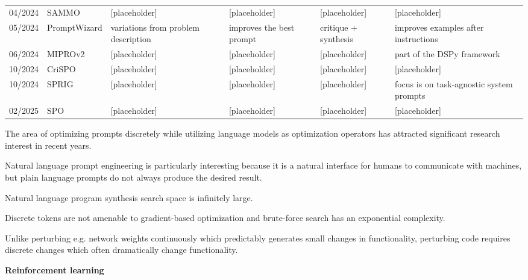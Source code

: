 \begin{landscape}
\begin{longtable}{@{}l l p{3.5cm} p{3.5cm} p{3.5cm} p{3.5cm}@{}}
04/2024 & SAMMO\cite{schnabel2024symbolicpromptprogramsearch} & [placeholder] & [placeholder] & [placeholder] & [placeholder] \\
05/2024 & PromptWizard\cite{agarwal2024promptwizardtaskawarepromptoptimization} & variations from problem description & improves the best prompt & critique + synthesis & improves examples after instructions \\
06/2024 & MIPROv2\cite{opsahlong2024optimizinginstructionsdemonstrationsmultistage} & [placeholder] & [placeholder] & [placeholder] & part of the DSPy\cite{khattab2023dspycompilingdeclarativelanguage} framework \\
10/2024 & CriSPO\cite{he2024crispomultiaspectcritiquesuggestionguidedautomatic} & [placeholder] & [placeholder] & [placeholder] & [placeholder] \\
10/2024 & SPRIG\cite{zhang2024sprigimprovinglargelanguage} & [placeholder] & [placeholder] & [placeholder] & focus is on task-agnostic system prompts \\
02/2025 & SPO\cite{xiang2025selfsupervisedpromptoptimization} & [placeholder] & [placeholder] & [placeholder] & [placeholder] \\
\bottomrule
\end{longtable}
\end{landscape}




The area of optimizing prompts discretely while utilizing language models 
as optimization operators has attracted significant research interest in recent years.

Natural language prompt engineering is particularly interesting because it is a 
natural interface for humans to communicate with machines, but plain language prompts do not always produce the desired result. \cite{zhou2023largelanguagemodelshumanlevel}

Natural language program synthesis search space is infinitely large. \cite{zhou2023largelanguagemodelshumanlevel}

Discrete tokens are not amenable to gradient-based optimization and brute-force search has an exponential complexity. \cite{deng2022rlpromptoptimizingdiscretetext}

Unlike perturbing e.g. network weights continuously which predictably generates small changes in functionality, 
perturbing code requires discrete changes which often dramatically change functionality. \cite{lehman2022evolutionlargemodels}

\textbf{Reinforcement learning}


